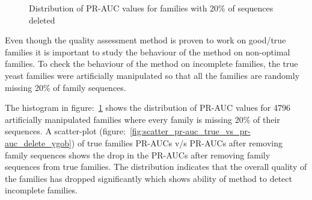 \documentclass{article}
\begin{document}
		\begin{figure}
			\caption{Distribution of PR-AUC values for families with 20\% of sequences deleted}
			\label{fig:hist_pr-auc_delete_ygob}
		\end{figure}
		
		Even though the quality assessment method is proven to work on good/true families it is important to study the behaviour of the method on non-optimal families. To check the behaviour of the method on incomplete families, the true yeast families were artificially manipulated so that all the families are randomly missing 20\% of family sequences.
		
		The histogram in figure:~\ref{fig:hist_pr-auc_delete_ygob} shows the distribution of PR-AUC values for 4796 artificially manipulated families where every family is missing 20\% of their sequences. A scatter-plot (figure:~\ref{fig:scatter_pr-auc_true_vs_pr-auc_delete_ygob}) of true families PR-AUCs v/s PR-AUCs after removing family sequences shows the drop in the PR-AUCs after removing family sequences from true families. The distribution indicates that the overall quality of the families has dropped significantly which shows ability of method to detect incomplete families.
		
\end{document}
